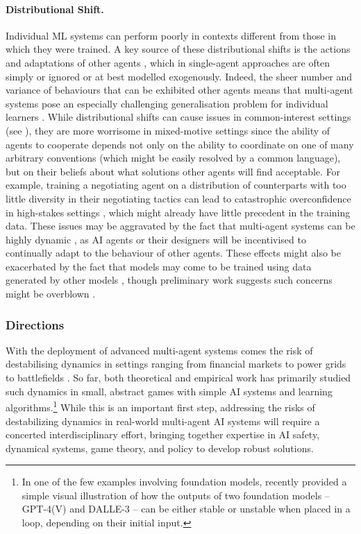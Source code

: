 \paragraph{Distributional Shift.}
Individual ML systems can perform poorly in contexts different from those in which they were trained.
A key source of these distributional shifts is the actions and adaptations of other agents \citep{Papoudakis2019-es,Piliouras2022,Narang2023}, which in single-agent approaches are often simply or ignored or at best modelled exogenously.
Indeed, the sheer number and variance of behaviours that can be exhibited other agents means that multi-agent systems pose an especially challenging generalisation problem for individual learners \citep{Agapiou2022-an,Leibo2021-cf,Stone2010}.
While distributional shifts can cause issues in common-interest settings (see ), they are more worrisome in mixed-motive settings since the ability of agents to cooperate depends not only on the ability to coordinate on one of many arbitrary conventions (which might be easily resolved
by a common language), but on their beliefs about what solutions other agents will find acceptable. 
For example, training a negotiating agent on a distribution of counterparts with too little diversity in their negotiating tactics can lead to catastrophic overconfidence in high-stakes settings \citep[cf.][]{Stastny2021}, which might already have little precedent in the training data.
These issues may be aggravated by the fact that multi-agent systems can be highly dynamic \citep{Papoudakis2019-es}, as AI agents or their designers will be incentivised to continually adapt to the behaviour of other agents.
These effects might also be exacerbated by the fact that models may come to be trained using data generated by other models \citep[see also ]{Shumailov2024AIMC,Martnez2023TowardsUT,alemohammad_self-consuming_2023}, though preliminary work suggests such concerns might be overblown \citep{Gerstgrasser2024}.

\subsubsection{Directions}

With the deployment of advanced multi-agent systems comes the risk of destabilising dynamics in settings ranging from financial markets \citep{Kirilenko2017} to power grids \citep{schafer2018dynamically} to battlefields \citep{Johnson2021}.
So far, both theoretical and empirical work has primarily studied such dynamics in small, abstract games with simple AI systems and learning algorithms.\footnote{In one of the few examples involving foundation models, \citet{Fort_2023} recently provided a simple visual illustration of how the outputs of two foundation models -- GPT-4(V) and DALLE-3 -- can be either stable or unstable when placed in a loop, depending on their initial input.}
While this is an important first step, addressing the risks of destabilizing dynamics in real-world multi-agent AI systems will require a concerted interdisciplinary effort, bringing together expertise in AI safety, dynamical systems, game theory, and policy to develop robust solutions.

